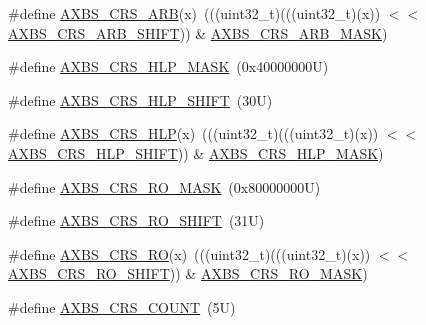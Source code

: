 \begin{DoxyCompactItemize}
\item 
\#define \mbox{\hyperlink{group___a_x_b_s___register___masks_ga2b01a1d5a44e1d72b164f55cfacdf01b}{A\+X\+B\+S\+\_\+\+C\+R\+S\+\_\+\+A\+RB}}(x)~(((uint32\+\_\+t)(((uint32\+\_\+t)(x)) $<$$<$ \mbox{\hyperlink{group___a_x_b_s___register___masks_ga1b37d1aff0c53735798f6de4ead2cf16}{A\+X\+B\+S\+\_\+\+C\+R\+S\+\_\+\+A\+R\+B\+\_\+\+S\+H\+I\+FT}})) \& \mbox{\hyperlink{group___a_x_b_s___register___masks_ga18bef8f761d00bf46b543a96adb7eae3}{A\+X\+B\+S\+\_\+\+C\+R\+S\+\_\+\+A\+R\+B\+\_\+\+M\+A\+SK}})
\item 
\#define \mbox{\hyperlink{group___a_x_b_s___register___masks_gab93f8320945abd915c31020d4d147d33}{A\+X\+B\+S\+\_\+\+C\+R\+S\+\_\+\+H\+L\+P\+\_\+\+M\+A\+SK}}~(0x40000000\+U)
\item 
\#define \mbox{\hyperlink{group___a_x_b_s___register___masks_ga6cf361c996f63fd5cc169c352971bcd2}{A\+X\+B\+S\+\_\+\+C\+R\+S\+\_\+\+H\+L\+P\+\_\+\+S\+H\+I\+FT}}~(30\+U)
\item 
\#define \mbox{\hyperlink{group___a_x_b_s___register___masks_ga1671d20edeaff1494e13a47464e5fee3}{A\+X\+B\+S\+\_\+\+C\+R\+S\+\_\+\+H\+LP}}(x)~(((uint32\+\_\+t)(((uint32\+\_\+t)(x)) $<$$<$ \mbox{\hyperlink{group___a_x_b_s___register___masks_ga6cf361c996f63fd5cc169c352971bcd2}{A\+X\+B\+S\+\_\+\+C\+R\+S\+\_\+\+H\+L\+P\+\_\+\+S\+H\+I\+FT}})) \& \mbox{\hyperlink{group___a_x_b_s___register___masks_gab93f8320945abd915c31020d4d147d33}{A\+X\+B\+S\+\_\+\+C\+R\+S\+\_\+\+H\+L\+P\+\_\+\+M\+A\+SK}})
\item 
\#define \mbox{\hyperlink{group___a_x_b_s___register___masks_gac511a1f4f6590cd86da388390b2993b5}{A\+X\+B\+S\+\_\+\+C\+R\+S\+\_\+\+R\+O\+\_\+\+M\+A\+SK}}~(0x80000000\+U)
\item 
\#define \mbox{\hyperlink{group___a_x_b_s___register___masks_ga51572e77d4fe6c519be097a8e6324331}{A\+X\+B\+S\+\_\+\+C\+R\+S\+\_\+\+R\+O\+\_\+\+S\+H\+I\+FT}}~(31\+U)
\item 
\#define \mbox{\hyperlink{group___a_x_b_s___register___masks_ga7adbeb6e9e7cd0f0613f079250efe284}{A\+X\+B\+S\+\_\+\+C\+R\+S\+\_\+\+RO}}(x)~(((uint32\+\_\+t)(((uint32\+\_\+t)(x)) $<$$<$ \mbox{\hyperlink{group___a_x_b_s___register___masks_ga51572e77d4fe6c519be097a8e6324331}{A\+X\+B\+S\+\_\+\+C\+R\+S\+\_\+\+R\+O\+\_\+\+S\+H\+I\+FT}})) \& \mbox{\hyperlink{group___a_x_b_s___register___masks_gac511a1f4f6590cd86da388390b2993b5}{A\+X\+B\+S\+\_\+\+C\+R\+S\+\_\+\+R\+O\+\_\+\+M\+A\+SK}})
\item 
\#define \mbox{\hyperlink{group___a_x_b_s___register___masks_gafec776ec3a19bbb4e041af7409542a9e}{A\+X\+B\+S\+\_\+\+C\+R\+S\+\_\+\+C\+O\+U\+NT}}~(5\+U)
\end{DoxyCompactItemize}
